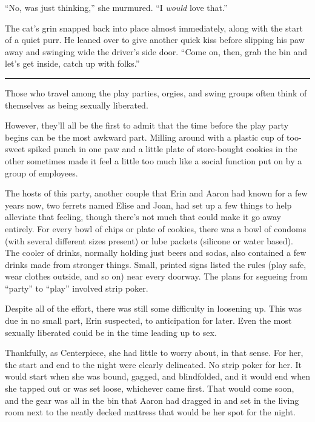 ``No, was just thinking,'' she murmured. ``I \emph{would} love that.''

The cat's grin snapped back into place almost immediately, along with
the start of a quiet purr. He leaned over to give another quick kiss
before slipping his paw away and swinging wide the driver's side door.
``Come on, then, grab the bin and let's get inside, catch up with
folks.''

\begin{center}\rule{0.5\linewidth}{\linethickness}\end{center}

Those who travel among the play parties, orgies, and swing groups often
think of themselves as being sexually liberated.

However, they'll all be the first to admit that the time before the play
party begins can be the most awkward part. Milling around with a plastic
cup of too-sweet spiked punch in one paw and a little plate of
store-bought cookies in the other sometimes made it feel a little too
much like a social function put on by a group of employees.

The hosts of this party, another couple that Erin and Aaron had known
for a few years now, two ferrets named Elise and Joan, had set up a few
things to help alleviate that feeling, though there's not much that
could make it go away entirely. For every bowl of chips or plate of
cookies, there was a bowl of condoms (with several different sizes
present) or lube packets (silicone or water based). The cooler of
drinks, normally holding just beers and sodas, also contained a few
drinks made from stronger things. Small, printed signs listed the rules
(play safe, wear clothes outside, and so on) near every doorway. The
plans for segueing from ``party'' to ``play'' involved strip poker.

Despite all of the effort, there was still some difficulty in loosening
up. This was due in no small part, Erin suspected, to anticipation for
later. Even the most sexually liberated could be in the time leading up
to sex.

Thankfully, as Centerpiece, she had little to worry about, in that
sense. For her, the start and end to the night were clearly delineated.
No strip poker for her. It would start when she was bound, gagged, and
blindfolded, and it would end when she tapped out or was set loose,
whichever came first. That would come soon, and the gear was all in the
bin that Aaron had dragged in and set in the living room next to the
neatly decked mattress that would be her spot for the night.


